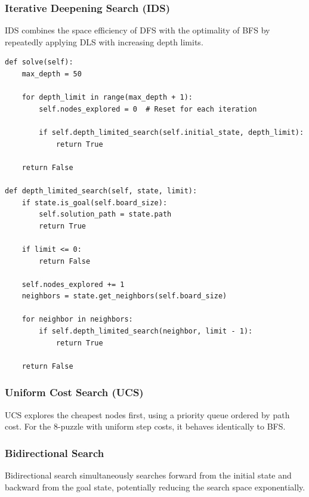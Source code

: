 \documentclass[11pt,a4paper]{article}
\begin{document}
\subsubsection{Iterative Deepening Search (IDS)}

IDS combines the space efficiency of DFS with the optimality of BFS by repeatedly applying DLS with increasing depth limits.

\begin{lstlisting}[caption=IDS Progressive Depth Implementation]
def solve(self):
    max_depth = 50
    
    for depth_limit in range(max_depth + 1):
        self.nodes_explored = 0  # Reset for each iteration
        
        if self.depth_limited_search(self.initial_state, depth_limit):
            return True
            
    return False

def depth_limited_search(self, state, limit):
    if state.is_goal(self.board_size):
        self.solution_path = state.path
        return True
        
    if limit <= 0:
        return False
        
    self.nodes_explored += 1
    neighbors = state.get_neighbors(self.board_size)
    
    for neighbor in neighbors:
        if self.depth_limited_search(neighbor, limit - 1):
            return True
            
    return False
\end{lstlisting}

\subsubsection{Uniform Cost Search (UCS)}

UCS explores the cheapest nodes first, using a priority queue ordered by path cost. For the 8-puzzle with uniform step costs, it behaves identically to BFS.

\subsubsection{Bidirectional Search}

Bidirectional search simultaneously searches forward from the initial state and backward from the goal state, potentially reducing the search space exponentially.
\end{document}
